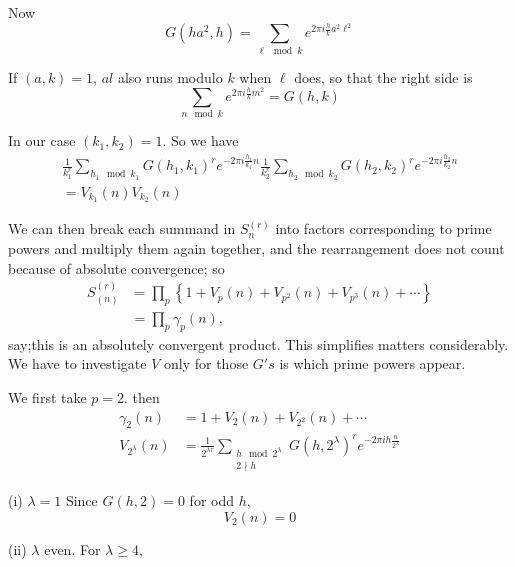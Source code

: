 Now\pageoriginale 
$$
G (ha^2, h) = \sum_{\ell \mod k} e^{2 \pi i \frac{h}{k} a^2 \ell^2}
$$

If $(a, k)=1$, $al$ also runs modulo $k$ when $\ell$ does, so that the
right side is
$$
\sum_{n \mod k} e^{2 \pi i \frac{h}{k} m^2}= G(h, k)
$$

In our case $(k_1, k_2)=1$. So we have
\begin{gather*}
  \frac{1}{k_1^r} \sum_{h_1 \mod k_1} G(h_1, k_1)^r e^{- 2 \pi i
    \frac{h_1}{k_1} n}\frac{1}{k_2^r} \sum_{h_2 \mod k_2} G(h_2,
  k_2)^r e^{- 2 \pi i \frac{h_2}{k_2}n}\\
  = V_{k_1} (n) V_{k_2} (n)
\end{gather*}

We can then break each summand in $S^{(r)}_n$ into factors corresponding
to prime powers and multiply them again together, and the
rearrangement does not count because of absolute convergence; so
\begin{align*}
  S^{(r)}_{(n)} & = \prod_p \left\{ 1+ V_p (n) + V_{p^2}(n) +
  V_{p^3}(n) + \cdots \right\}\\
  & = \prod_p \gamma_p (n),
\end{align*}
say;\pageoriginale this is an absolutely convergent product. This
simplifies matters considerably. We have to investigate $V$ only for
those $G's$ is which prime powers appear.

We first take $p=2$. then
\begin{align*}
  \gamma_2 (n) & = 1+ V_2 (n) + V_{2^2}(n) + \cdots \\
  V_{2^\lambda} (n) & = \frac{1}{2^{\lambda r}} \sum_{\substack{h \mod
        2^\lambda\\ 2 \nmid h}} G(h, 2^\lambda)^r e^{-2\pi i h \frac{n}{2^\lambda}} 
\end{align*}

(i) $\lambda=1$ Since $G(h, 2)=0$ for odd $h$,
  $$
  V_2 (n) =0
  $$

(ii) $\lambda$ even. For $\lambda \geq 4$, 
  
